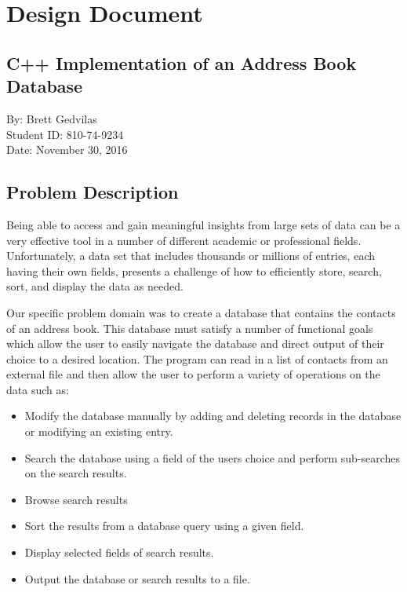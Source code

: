 \documentclass[11pt]{article}
\begin{document}
\newpage


\section*{Design Document}

\subsection*{C++ Implementation of an Address Book Database}
\begin{center}
\vspace{.5cm}
By: Brett Gedvilas\\
Student ID: 810-74-9234\\
Date: November 30, 2016\\
\end{center}

\subsection*{Problem Description}

	Being able to access and gain meaningful insights from large sets of data can be a very effective tool in a number of
different academic or professional fields. Unfortunately, a data set that includes thousands or millions of entries, each
having their own fields, presents a challenge of how to efficiently store, search, sort, and display the data as needed. 

	Our specific problem domain was to create a database that contains the contacts of an address book. This database must
satisfy a number of functional goals which allow the user to easily navigate the database and direct output of their choice
to a desired location. The program can read in a list of contacts from an external file and then allow the user to perform a variety of operations on the data such as: 
\begin{itemize}
	\item Modify the database manually by adding and deleting records in the database or modifying an existing entry.
	\item Search the database using a field of the users choice and perform sub-searches on the search results.
	\item Browse search results
	\item Sort the results from a database query using a given field.
	\item Display selected fields of search results.
	\item Output the database or search results to a file.
\end{itemize}
\newpage
\end{document}
